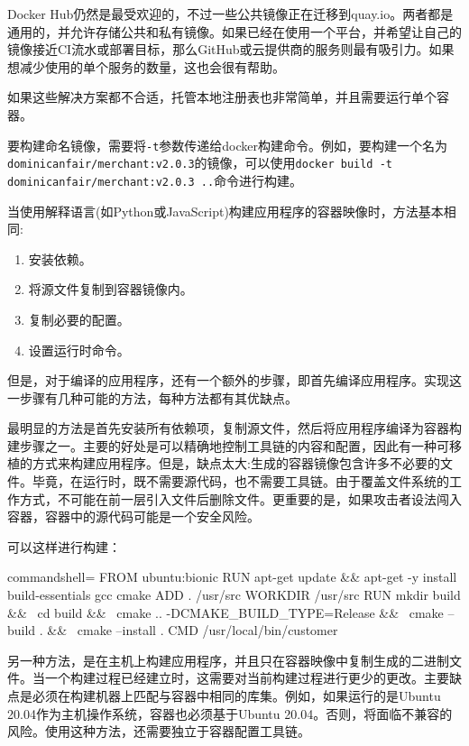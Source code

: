 Docker Hub仍然是最受欢迎的，不过一些公共镜像正在迁移到quay.io。两者都是通用的，并允许存储公共和私有镜像。如果已经在使用一个平台，并希望让自己的镜像接近CI流水或部署目标，那么GitHub或云提供商的服务则最有吸引力。如果想减少使用的单个服务的数量，这也会很有帮助。

如果这些解决方案都不合适，托管本地注册表也非常简单，并且需要运行单个容器。

要构建命名镜像，需要将\texttt{-t}参数传递给docker构建命令。例如，要构建一个名为\texttt{dominicanfair/merchant:v2.0.3}的镜像，可以使用\texttt{docker build -t dominicanfair/merchant:v2.0.3 ..}命令进行构建。


当使用解释语言(如Python或JavaScript)构建应用程序的容器映像时，方法基本相同:

\begin{enumerate}
\item 
安装依赖。

\item 
将源文件复制到容器镜像内。

\item 
复制必要的配置。

\item 
设置运行时命令。
\end{enumerate}

但是，对于编译的应用程序，还有一个额外的步骤，即首先编译应用程序。实现这一步骤有几种可能的方法，每种方法都有其优缺点。

最明显的方法是首先安装所有依赖项，复制源文件，然后将应用程序编译为容器构建步骤之一。主要的好处是可以精确地控制工具链的内容和配置，因此有一种可移植的方式来构建应用程序。但是，缺点太大:生成的容器镜像包含许多不必要的文件。毕竟，在运行时，既不需要源代码，也不需要工具链。由于覆盖文件系统的工作方式，不可能在前一层引入文件后删除文件。更重要的是，如果攻击者设法闯入容器，容器中的源代码可能是一个安全风险。

可以这样进行构建：

\begin{tcblisting}{commandshell={}}
FROM ubuntu:bionic
RUN apt-get update && apt-get -y install build-essentials gcc cmake
ADD . /usr/src
WORKDIR /usr/src
RUN mkdir build && \
    cd build && \
    cmake .. -DCMAKE_BUILD_TYPE=Release && \
    cmake --build . && \
    cmake --install .
CMD /usr/local/bin/customer
\end{tcblisting}

另一种方法，是在主机上构建应用程序，并且只在容器映像中复制生成的二进制文件。当一个构建过程已经建立时，这需要对当前构建过程进行更少的更改。主要缺点是必须在构建机器上匹配与容器中相同的库集。例如，如果运行的是Ubuntu 20.04作为主机操作系统，容器也必须基于Ubuntu 20.04。否则，将面临不兼容的风险。使用这种方法，还需要独立于容器配置工具链。

